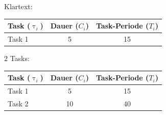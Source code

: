 \begin{frame}
	Klartext:\\
	\begin{center}
		\begin{tabular}{l||c|c}
			Task ($\uptau_i$) & Dauer ($C_i$) & Task-Periode ($T_i$)\\\hline\hline
			Task 1 & 5 & 15
		\end{tabular}
	\end{center}
\end{frame}

\begin{frame}
	
\end{frame}

\begin{frame}
	
\end{frame}

\begin{frame}
	
\end{frame}

\begin{frame}
	
\end{frame}

\begin{frame}
	2 Tasks:
	\begin{center}
		\begin{tabular}{l||c|c}
				Task ($\uptau_i$) & Dauer ($C_i$) & Task-Periode ($T_i$)\\\hline\hline
				Task 1 & 5 & 15\\
				Task 2 & 10 & 40\\
		\end{tabular}
	\end{center}
\end{frame}

\begin{frame}
	
\end{frame}

\begin{frame}
	
\end{frame}
